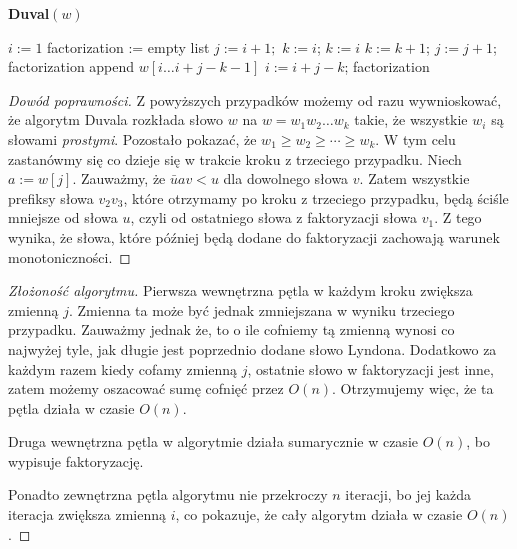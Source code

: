 \documentclass{article}
\begin{document}
\begin{algorithm}[H]
    \caption{\textbf{Duval$(w)$}}
    \begin{algorithmic}
        \State $i := 1$
        \State factorization := empty list
            \State $j := i+1;$  $k := i$;
                    \State $k := i$
                \Else
                    \State $k := k + 1$;
                \EndIf
                \State $j := j + 1$;
            \EndWhile
                \State factorization append $w[i\ldots i+j-k-1]$
                \State $i := i + j - k$;
           \EndWhile
        \EndWhile
        \State \Return factorization
    \end{algorithmic}
\end{algorithm}

\begin{proof}[Dowód poprawności]
    Z powyższych przypadków możemy od razu wywnioskować, że algorytm Duvala rozkłada słowo $w$ na 
    $w = w_1w_2\ldots w_k$ takie, że wszystkie $w_i$ są słowami \textit{prostymi}.
    Pozostało pokazać, że $w_1 \geq w_2 \geq \cdots \geq w_k$. 
    W tym celu zastanówmy się co dzieje się w trakcie kroku z trzeciego przypadku. Niech $a := w[j]$. 
    Zauważmy, że $\bar{u}av < u$ dla 
    dowolnego słowa $v$. Zatem wszystkie prefiksy słowa $v_2v_3$, które otrzymamy po kroku z trzeciego przypadku,
    będą ściśle mniejsze od słowa $u$, czyli od ostatniego słowa z faktoryzacji słowa $v_1$. 
    Z tego wynika, że słowa, które później będą dodane do faktoryzacji zachowają warunek monotoniczności.
\end{proof}

\begin{proof}[Złożoność algorytmu]    
    Pierwsza wewnętrzna pętla w każdym kroku zwiększa zmienną $j$. Zmienna ta
    może być jednak zmniejszana w wyniku trzeciego przypadku. Zauważmy jednak że, 
    to o ile cofniemy tą zmienną wynosi co najwyżej tyle, jak długie jest poprzednio dodane słowo Lyndona. 
    Dodatkowo za każdym razem kiedy cofamy zmienną $j$, ostatnie słowo w faktoryzacji jest inne, zatem
    możemy oszacować sumę cofnięć przez $O(n)$. Otrzymujemy więc, że ta pętla działa w czasie $O(n)$.
    
    Druga wewnętrzna pętla w algorytmie działa sumarycznie w czasie $O(n)$, bo wypisuje faktoryzację.

    Ponadto zewnętrzna pętla algorytmu nie przekroczy $n$ iteracji, 
    bo jej każda iteracja zwiększa zmienną $i$, co pokazuje, że cały algorytm działa w czasie $O(n)$.
\end{proof}
\end{document}
